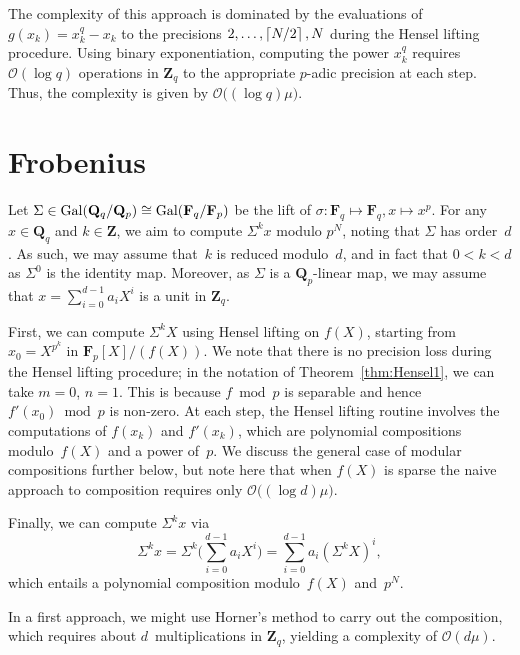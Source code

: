 The complexity of this approach is dominated by the evaluations 
of $g(x_k) = x_k^q - x_k$ to the precisions $2, \dotsc, \left\lceil N/2\right\rceil, N$ 
during the Hensel lifting procedure.  Using binary exponentiation, 
computing the power $x_k^q$ requires $\mathcal{O}(\log q)$ operations 
in $\mathbf{Z}_q$ to the appropriate $p$-adic precision at each step. 
Thus, the complexity is given by $\mathcal{O}\bigl((\log q) \mu\bigr)$.

\section{Frobenius}

Let $\Sigma \in \operatorname{Gal}(\mathbf{Q}_q/\mathbf{Q}_p) \cong \operatorname{Gal}(\mathbf{F}_q/\mathbf{F}_p)$ 
be the lift of $\sigma \colon \mathbf{F}_q \mapsto \mathbf{F}_q, x \mapsto x^p$. 
For any $x \in \mathbf{Q}_q$ and $k \in \mathbf{Z}$, we aim to compute $\Sigma^k x$ 
modulo $p^N$, noting that $\Sigma$ has order~$d$.  As such, we may assume that~$k$ 
is reduced modulo~$d$, and in fact that $0 < k < d$ as $\Sigma^0$ is the identity map.
Moreover, as $\Sigma$ is a $\mathbf{Q}_p$-linear map, we may assume that 
$x = \sum_{i=0}^{d-1} a_i X^i$ is a unit in $\mathbf{Z}_q$.  

First, we can compute $\Sigma^k X$ using Hensel lifting on $f(X)$, 
starting from $x_0 = X^{p^k}$ in $\mathbf{F}_p[X] / (f(X))$.  We note 
that there is no precision loss during the Hensel lifting procedure;  
in the notation of Theorem~\ref{thm:Hensel1}, we can take $m = 0$, $n = 1$. 
This is because $f \bmod p$ is separable and hence $f'(x_0) \bmod p$ is 
non-zero.  At each step, the Hensel lifting routine involves the computations 
of $f(x_k)$ and $f'(x_k)$, which are polynomial compositions modulo~$f(X)$ 
and a power of~$p$.  We discuss the general case of modular compositions 
further below, but note here that when $f(X)$ is sparse the naive approach 
to composition requires only $\mathcal{O}\bigl((\log d) \mu\bigr)$.

Finally, we can compute $\Sigma^k x$ via 
\begin{equation}
\Sigma^k x = 
    \Sigma^k \bigl( \sum_{i=0}^{d-1} a_i X^i \bigr) = 
    \sum_{i=0}^{d-1} a_i (\Sigma^k X)^i, 
\end{equation}
which entails a polynomial composition modulo~$f(X)$ and~$p^N$.

In a first approach, we might use Horner's method to carry out the 
composition, which requires about $d$~multiplications in $\mathbf{Z}_q$, 
yielding a complexity of $\mathcal{O}(d \mu)$.  


